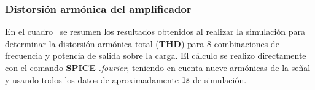 \clearpage

\subsubsection{Distorsión armónica del amplificador}

En el cuadro~ se resumen los resultados obtenidos al realizar la simulación para determinar la distorsión armónica total (\textbf{THD}) para 8 combinaciones de frecuencia y potencia de salida sobre la carga. El cálculo se realizo directamente con el comando \textbf{SPICE} \textit{.fourier}, teniendo en cuenta nueve armónicas de la señal y usando todos los datos de aproximadamente $1\si[per-mode=symbol]{\second}$ de simulación.



 
\begin{table}[H]  %
    
    \setlength\arrayrulewidth{1.5pt}
    \def\clinecolor{\hhline{|>{\arrayrulecolor{white}}-%
    >{\arrayrulecolor{white}}|-|-|-|-|}}
	\caption{\footnotesize{Distorsión armónica total (\textbf{THD}).}}
	\label{table:table_THD}
\end{table}

